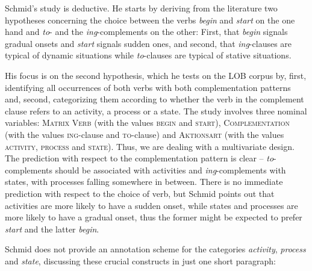 Schmid's study is deductive.  He starts by deriving from the literature two hypotheses concerning the choice between the verbs  \textit{begin} and \textit{start} on the one hand and \textit{to}- and the \textit{ing}-complements  on the other: First, that \textit{begin} signals gradual onsets and \textit{start} signals sudden ones, and second, that \textit{ing}-clauses are typical of dynamic  situations while \textit{to}-clauses are typical of stative  situations.

His focus is on the second hypothesis, which he tests on the LOB  corpus by, first, identifying all occurrences of both verbs  with both complementation  patterns and, second, categorizing  them according to whether the verb in the complement clause refers to an activity,  a process  or a state.  The study involves three nominal  variables: \textsc{Matrix Verb} (with the values \textsc{begin} and \textsc{start}), \textsc{Complementation}  (with the values \textsc{ing}-clause and \textsc{to}-clause) and \textsc{Aktionsart}  (with the values \textsc{activity},  \textsc{process}  and \textsc{state}).  Thus, we are dealing with a multivariate  design.  The prediction with respect to the complementation pattern is clear -- \textit{to}-complements should be associated  with activities  and \textit{ing}-complements with states,  with processes  falling somewhere in between. There is no immediate prediction with respect to the choice of verb,  but Schmid points out that activities  are more likely to have a sudden onset, while states  and processes  are more likely to have a gradual onset, thus the former might be expected  to prefer \textit{start} and the latter \textit{begin}.

Schmid does not provide an annotation  scheme for the categories  \textit{activity},  \textit{process}  and \textit{state},  discussing these crucial constructs in just one short paragraph:

